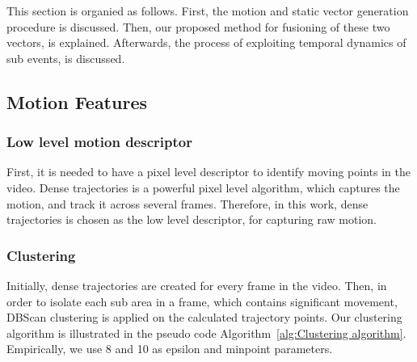 
This section is organied as follows. First, the motion and static vector generation procedure is discussed. Then,
our proposed method for fusioning of these two vectors, is explained. Afterwards, the process of exploiting temporal dynamics of 
sub events, is discussed. 


\subsection{Motion Features}
\subsubsection{Low level motion descriptor}
First, it is needed to have a pixel level descriptor to identify moving points in the video. Dense trajectories is a powerful
pixel level algorithm, which captures the motion, and track it across several frames. Therefore, in this work, 
dense trajectories is chosen as the low level descriptor, for capturing raw motion.

\subsubsection{Clustering}

Initially, dense trajectories are created for every frame in the video.
Then, in order to isolate each sub area in a frame, which contains significant movement, DBScan clustering is applied on the 
calculated trajectory points.
Our clustering algorithm is illustrated in the pseudo code Algorithm~\ref{alg:Clustering algorithm}. Empirically, we use 8 and 10 as epsilon and minpoint parameters.



